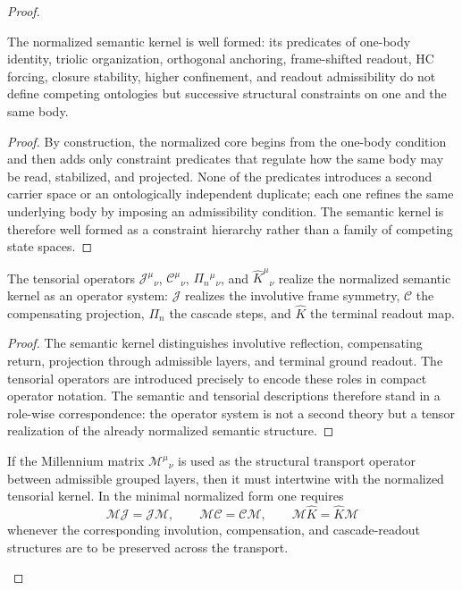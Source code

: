 \begin{proof}
\begin{lemma}
\label{lem:semantic-kernel-well-formedness-lemma}
The normalized semantic kernel is well formed: its predicates of one-body
identity, triolic organization, orthogonal anchoring, frame-shifted readout,
HC forcing, closure stability, higher confinement, and readout admissibility do
not define competing ontologies but successive structural constraints on one and
the same body.
\end{lemma}

\begin{proof}
By construction, the normalized core begins from the one-body condition and then
adds only constraint predicates that regulate how the same body may be read,
stabilized, and projected. None of the predicates introduces a second carrier
space or an ontologically independent duplicate; each one refines the same
underlying body by imposing an admissibility condition. The semantic kernel is
therefore well formed as a constraint hierarchy rather than a family of
competing state spaces.
\end{proof}

\begin{lemma}
\label{lem:tensor-realization-lemma}
The tensorial operators $\mathcal J^\mu{}_{\nu}$, $\mathcal C^\mu{}_{\nu}$,
$\Pi_n{}^\mu{}_{\nu}$, and $\hat K^\mu{}_{\nu}$ realize the normalized semantic
kernel as an operator system: $\mathcal J$ realizes the involutive frame
symmetry, $\mathcal C$ the compensating projection, $\Pi_n$ the cascade steps,
and $\hat K$ the terminal readout map.
\end{lemma}

\begin{proof}
The semantic kernel distinguishes involutive reflection, compensating return,
projection through admissible layers, and terminal ground readout. The tensorial
operators are introduced precisely to encode these roles in compact operator
notation. The semantic and tensorial descriptions therefore stand in a role-wise
correspondence: the operator system is not a second theory but a tensor
realization of the already normalized semantic structure.
\end{proof}

\begin{lemma}
\label{lem:millennium-intertwining-lemma}
If the Millennium matrix $\mathcal M^\mu{}_{\nu}$ is used as the structural
transport operator between admissible grouped layers, then it must intertwine
with the normalized tensorial kernel. In the minimal normalized form one
requires
\[
\mathcal M\mathcal J=\mathcal J\mathcal M,
\qquad
\mathcal M\mathcal C=\mathcal C\mathcal M,
\qquad
\mathcal M\hat K=\hat K\mathcal M
\]
whenever the corresponding involution, compensation, and cascade-readout
structures are to be preserved across the transport.
\end{lemma}


\end{proof}
